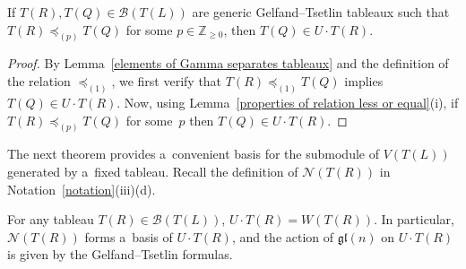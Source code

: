 \begin{Corollary}\label{Gelfand--Tsetlin modules property}\sloppy
If $T(R), T(Q)\in \mathcal{B}(T(L))$ are generic Gelfand--Tsetlin tableaux such that
\mbox{$T(R)\preceq_{(p)} T(Q)$} for some $p\in\mathbb{Z}_{\geq 0}$, then $T(Q)\in U\cdot T(R)$.
\end{Corollary}
\begin{proof}
By Lemma~\ref{elements of Gamma separates tableaux} and the def\/inition of the relation $\preceq_{(1)}$, we f\/irst verify
that ${T(R)\preceq_{(1)}\! T(Q)}$ implies $T(Q)\in U\cdot T(R)$.
Now, using Lemma~\ref{properties of relation less or equal}(i), if $T(R)\preceq_{(p)} T(Q)$ for some~$p$ then $T(Q)\in
U\cdot T(R)$.
\end{proof}

The next theorem provides a~convenient basis for the submodule of $V(T(L))$ generated by a~f\/ixed tableau.
Recall the def\/inition of $\mathcal{N}(T(R))$ in Notation~\ref{notation}(iii)(d).

\begin{Theorem}
\label{basis of submodule generated by T}
For any tableau $T(R)\in\mathcal{B}(T(L))$, $U\cdot T(R)= W(T(R))$.
In particular, $\mathcal{N}(T(R))$ forms a~basis of $U\cdot T(R)$, and the action of $\mathfrak{gl}(n)$ on $U\cdot T(R)$
is given by the Gelfand--Tsetlin formulas.
\end{Theorem}

